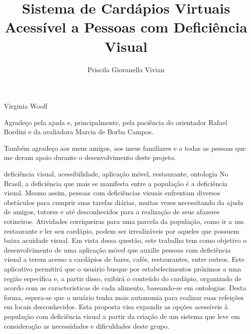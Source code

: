 \documentclass[portuguese,oneside]{tcc}
\author{Priscila Giovanella Vivian}
\title{Sistema de Cardápios Virtuais Acessível a Pessoas com Deficiência Visual}
      {A Virtual Menu System Accessible to Visually Impaired People}
\begin{document}

         {Virginia Woolf}


\begin{agradecimentos}
Agradeço pela ajuda e, principalmente, pela paciência do orientador Rafael Bordini e da avaliadora Marcia de Borba Campos.

Também agradeço aos meus amigos, aos meus familiares e a todas as pessoas que me deram apoio durante o desenvolvimento deste projeto.
\end{agradecimentos}

\begin{resumo}{deficiência visual, acessibilidade, aplicação móvel, restaurante, ontologia}
No Brasil, a deficiência que mais se manifesta entre a população é a deficiência visual. Mesmo assim, pessoas com deficiências visuais enfrentam diversos obstáculos para cumprir suas tarefas diárias, muitas vezes necessitando da ajuda de amigos, tutores e até desconhecidos para a realização de seus afazeres rotineiros. Atividades corriqueiras para uma parcela da população, como ir a um restaurante e ler seu cardápio, podem ser irrealizáveis por aqueles que possuem baixa acuidade visual. Em vista dessa questão, este trabalho tem como objetivo o desenvolvimento de uma aplicação móvel que auxilie pessoas com deficiência visual a terem acesso a cardápios de bares, cafés, restaurantes, entre outros. Este aplicativo permitirá que o usuário busque por estabelecimentos próximos a uma região específica e, a partir disso, exibirá o conteúdo do cardápio, organizado de acordo com as características de cada alimento, baseando-se em ontologias. Desta forma, espera-se que o usuário tenha mais autonomia para realizar suas refeições em locais desconhecidos. Esta proposta visa expandir as opções acessíveis à população com deficiência visual a partir da criação de um sistema que leve em consideração as necessidades e dificuldades deste grupo.
\end{resumo}
\end{document}
